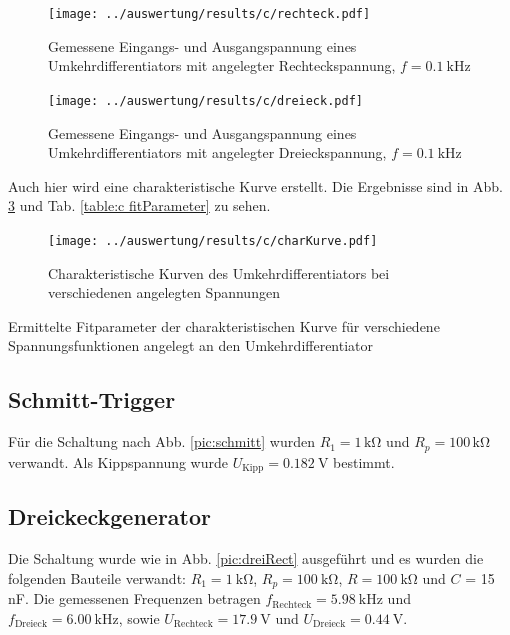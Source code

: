 \begin{figure}
	\centering
	\texttt{[image: ../auswertung/results/c/rechteck.pdf]}
	\caption{Gemessene Eingangs- und Ausgangspannung eines Umkehrdifferentiators mit angelegter Rechteckspannung, $f = 0.1\ \si{\kilo\hertz}$}
	\label{pic:c rechteck}
\end{figure}

\begin{figure}
	\centering
	\texttt{[image: ../auswertung/results/c/dreieck.pdf]}
	\caption{Gemessene Eingangs- und Ausgangspannung eines Umkehrdifferentiators mit angelegter Dreieckspannung, $f = 0.1\ \si{\kilo\hertz}$}
	\label{pic:c dreieck}
\end{figure}

Auch hier wird eine charakteristische Kurve erstellt. Die Ergebnisse sind in Abb. \ref{pic:c charKurve} und Tab. \ref{table:c fitParameter} zu sehen.

\begin{figure}
	\centering
	\texttt{[image: ../auswertung/results/c/charKurve.pdf]}
	\caption{Charakteristische Kurven des Umkehrdifferentiators bei verschiedenen angelegten Spannungen}
	\label{pic:c charKurve}
\end{figure}

\begin{table}
	\centering
	\caption{Ermittelte Fitparameter der charakteristischen Kurve für verschiedene Spannungsfunktionen angelegt an den Umkehrdifferentiator}
	
	\label{table:c fitParameter}
\end{table}

\subsection{Schmitt-Trigger}
Für die Schaltung nach Abb. \ref{pic:schmitt} wurden $R_1 = 1\, \si{\kilo\ohm}$ und $R_p = 100\, \si{\kilo\ohm}$ verwandt. Als Kippspannung wurde $U_\text{Kipp} = 0.182\ \si{\volt}$ bestimmt.

\subsection{Dreickeckgenerator}
Die Schaltung wurde wie in Abb. \ref{pic:dreiRect} ausgeführt und es wurden die folgenden Bauteile verwandt: $R_1 = 1\ \si{\kilo\ohm}$, $R_p = 100\ \si{\kilo\ohm}$, $R = 100\ \si{\kilo\ohm}$ und $C$ = 15 nF. Die gemessenen Frequenzen betragen $f_\text{Rechteck} = 5.98\ \si{\kilo\hertz}$ und $f_\text{Dreieck} = 6.00\ \si{\kilo\hertz}$, sowie $U_\text{Rechteck} = 17.9\ \si{\volt}$ und $U_\text{Dreieck} = 0.44\ \si{\volt}$.

